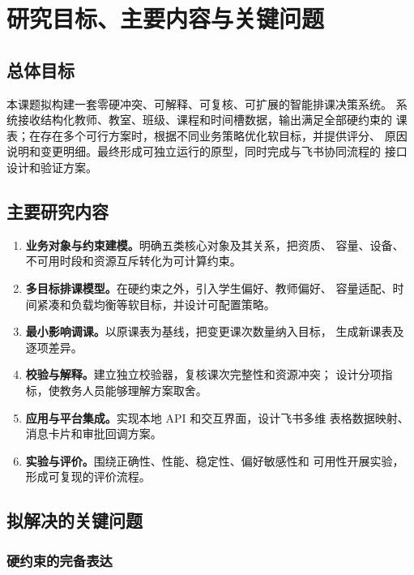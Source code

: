 \clearpage
\section{研究目标、主要内容与关键问题}

\subsection{总体目标}

本课题拟构建一套零硬冲突、可解释、可复核、可扩展的智能排课决策系统。
系统接收结构化教师、教室、班级、课程和时间槽数据，输出满足全部硬约束的
课表；在存在多个可行方案时，根据不同业务策略优化软目标，并提供评分、
原因说明和变更明细。最终形成可独立运行的原型，同时完成与飞书协同流程的
接口设计和验证方案。

\subsection{主要研究内容}

\begin{enumerate}
  \item \textbf{业务对象与约束建模。}明确五类核心对象及其关系，把资质、
  容量、设备、不可用时段和资源互斥转化为可计算约束。
  \item \textbf{多目标排课模型。}在硬约束之外，引入学生偏好、教师偏好、
  容量适配、时间紧凑和负载均衡等软目标，并设计可配置策略。
  \item \textbf{最小影响调课。}以原课表为基线，把变更课次数量纳入目标，
  生成新课表及逐项差异。
  \item \textbf{校验与解释。}建立独立校验器，复核课次完整性和资源冲突；
  设计分项指标，使教务人员能够理解方案取舍。
  \item \textbf{应用与平台集成。}实现本地 API 和交互界面，设计飞书多维
  表格数据映射、消息卡片和审批回调方案。
  \item \textbf{实验与评价。}围绕正确性、性能、稳定性、偏好敏感性和
  可用性开展实验，形成可复现的评价流程。
\end{enumerate}

\subsection{拟解决的关键问题}

\subsubsection{硬约束的完备表达}

